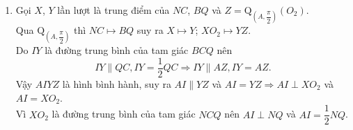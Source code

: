 \begin{bt}
{\begin{enumerate}
			\item Gọi $X$, $Y$ lần lượt là  trung điểm của $NC$, $BQ$ và $Z=\mathrm{Q}_{\left(A,\dfrac{\pi}{2}\right)}\left(O_2\right)$.\\
			Qua $\mathrm{Q}_{\left(A,\dfrac{\pi}{2}\right)}$ thì $NC\mapsto BQ$ suy ra $X\mapsto Y$; $XO_2\mapsto YZ$.\\
			Do $IY$ là đường trung bình của tam giác $BCQ$ nên
			 $$IY\parallel QC, IY=\dfrac{1}{2}QC\Rightarrow
			  IY\parallel AZ, IY=AZ.$$
			Vậy $AIYZ$ là hình bình hành, suy ra $AI\parallel YZ$ và $AI=YZ\Rightarrow AI\perp XO_2$ và $AI=XO_2$.\\
			  Vì $XO_2$ là đường trung bình của tam giác $NCQ$ nên $AI\perp
			   NQ$ và $AI=\dfrac{1}{2}NQ$.
		\end{enumerate}
	}
\end{bt}

